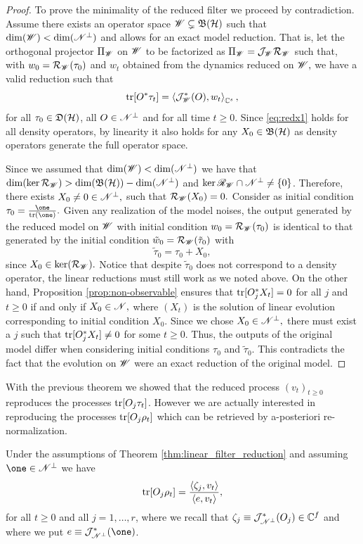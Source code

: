 \documentclass[aihp,12pt]{imsart}
\begin{document}
\begin{proof}
To prove the minimality of the reduced filter we proceed by contradiction. 
Assume there exists an operator space $\mathscr{W}\subsetneq\mathfrak{B}(\mathcal{H})$  such that $\dim(\mathscr{W})<\dim(\mathscr{N}^\perp)$ and allows for an exact model reduction. That is, let the orthogonal projector $\Pi_{\mathscr{W}}$ on $\mathscr{W}$ to be factorized as $\Pi_{\mathscr{W}} = \mathcal{J}_{\mathscr{W}}\mathcal{R}_{\mathscr{W}}$ 
such that, with $w_0 = \mathcal{R}_{\mathscr{W}}(\tau_0)$ and $w_t$ obtained from the dynamics reduced on $\mathscr{W},$ we have a valid reduction such that \begin{equation}\label{eq:redx1}{\rm tr}[O^*\tau_t] = \left< \mathcal{J}_{\mathscr{W}}^*(O),w_t \right>_{\mathbb{C}^s},\end{equation} for all $\tau_0\in\mathfrak{D}(\mathcal{H})$, all $O\in\mathscr{N}^\perp$ and for all time $t\geq0$. Since \eqref{eq:redx1} holds for all density operators, by linearity it also holds for any $X_0\in\mathfrak{B}(\mathcal{H})$ as density operators generate the full operator space.

Since we assumed that $\dim(\mathscr{W})<\dim(\mathscr{N}^\perp)$ we have that $\dim(\ker\mathcal{R}_{\mathscr{W}})>\dim(\mathfrak{B}(\mathcal{H}))-\dim(\mathscr{N}^\perp)$ and $\ker\mathscr{R}_{\mathscr{W}}\cap\mathscr{N}^\perp \neq\{0\}$. Therefore, there exists $X_0\neq 0 \in \mathscr{N}^\perp,$  such that $\mathcal{R}_{\mathscr{W}}(X_0)=0.$
Consider as initial condition $\tau_0=\frac{\one}{\tr{(\one )}}.$ Given any realization of the model noises, the output generated by the reduced model on $\mathscr{W}$ with initial condition $w_0=\mathcal{R}_{\mathscr{W}}(\tau_0)$ is identical to that generated by the initial condition \(\tilde w_0=\mathcal{R}_{\mathscr{W}}(\tilde\tau_0)\) with \[ \tilde\tau_0=\tau_0+X_0,\]
since $X_0\in\ker(\mathcal{R}_{\mathscr{W}}).$
Notice that despite $\tilde \tau_0$ does not correspond to a density operator, the linear reductions must still work as we noted above.
On the other hand, Proposition \ref{prop:non-observable}  ensures that ${\rm tr}[O_j^* X_t] = 0$ for all $j$ and $t\geq 0$ if and only if $X_0\in \mathscr{N},$ where $(X_t)$ is the solution of linear evolution corresponding to initial condition $X_0$. Since we chose $X_0\in\mathscr{N}^\perp,$ there must exist a $j$ such that ${\rm tr}[O_j^* X_t]\neq 0$ for some $t\geq 0.$ 
Thus, the outputs of the original model differ when considering  initial conditions $\tau_0$ and $\tilde\tau_0.$ 
This contradicts the fact that the evolution on $\mathscr{W}$ were an exact reduction of the original model.
\end{proof}

With the previous theorem we showed that the reduced process $(v_t)_{t\geq0}$ reproduces the processes ${\rm tr}[O_j \tau_t]$. However we are actually interested in reproducing the processes ${\rm tr}[O_j \rho_t]$ which can be retrieved by a-posteriori re-normalization.
\begin{corollary}
\label{cor:normalization}
    Under the assumptions of Theorem \ref{thm:linear_filter_reduction} and assuming $\one\in\Ns^\perp$ we have  $${\rm tr}[O_j \rho_t] = \frac{\left< \zeta_j,v_t \right>}{\left< e,v_t \right>},$$ for all $t\geq 0$ and all $j=1,\ldots,r$, where we recall that $\zeta_j \equiv \mathcal{J}_{\mathscr{N}^\perp}^*(O_j)\in\mathbb{C}^{f}$ and where we put $e\equiv\Jc_{\Ns^\perp}^*(\one)$.
\end{corollary}
\end{document}
